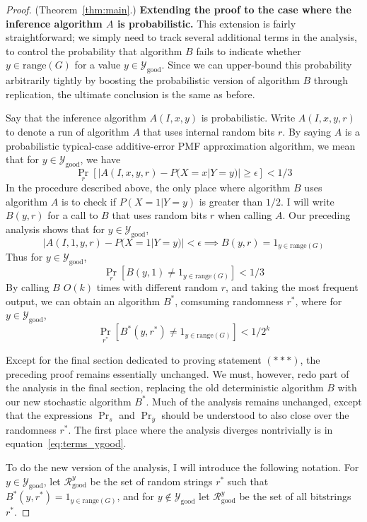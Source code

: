 \documentclass{article}
\def \Ygood{\mathcal{Y}_\text{good}}
\def \Rgood{\mathcal{R}_\text{good}}
\def \by{{\bar{y}}}
\theoremstyle{definition}
\theoremstyle{remark}
\begin{document}
\begin{proof}{(Theorem~\ref{thm:main}.)}
\medskip
\noindent
\textbf{Extending the proof to the case where the inference algorithm $A$ is probabilistic.}
This extension is fairly straightforward; we simply need to track several additional terms in the analysis, to control the probability that algorithm $B$ fails to indicate whether $y \in \text{range}(G)$ for a value $y \in \Ygood$.
Since we can upper-bound this probability arbitrarily tightly by boosting the probabilistic version of algorithm $B$ through replication, the ultimate conclusion is the same as before.

Say that the inference algorithm $A(I, x, y)$ is probabilistic.
Write $A(I, x, y, r)$ to denote a run of algorithm $A$ that uses internal random bits $r$.
By saying $A$ is a probabilistic typical-case additive-error PMF approximation algorithm, we mean that for $y \in \Ygood$, we have
$$
\Pr_r [|A(I, x, y, r) - P(X = x | Y = y)| \geq \epsilon] < 1/3
$$
In the procedure described above, the only place where algorithm $B$ uses algorithm $A$ is to check if $P(X = 1 | Y = y)$ is greater than $1/2$.
I will write $B(y, r)$ for a call to $B$ that uses random bits $r$ when calling $A$.
Our preceding analysis shows that for $y \in \Ygood$,
$$
|A(I, 1, y, r) - P(X = 1 | Y = y)| < \epsilon \implies  B(y, r) = 1_{y \in \text{range}(G)}
$$
Thus for $y \in \Ygood$,
$$
\Pr_r [B(y, 1) \neq 1_{y \in \text{range}(G)}] < 1/3
$$
By calling $B$ $O(k)$ times with different random $r$, and taking the most frequent output, we can obtain an algorithm $B^*$, comsuming randomness $r^*$, where for $y \in \Ygood$,
$$
\Pr_{r^*} [B^*(y, r^*) \neq 1_{y \in \text{range}(G)}] < 1/2^k
$$

Except for the final section dedicated to proving statement $(***)$, the preceding proof remains essentially unchanged.
We must, however, redo part of the analysis in the final section, replacing the old deterministic algorithm $B$ with our new stochastic algorithm $B^*$.
Much of the analysis remains unchanged, except that
the expressions $\Pr_s$ and $\Pr_\by$ should be understood to also close over the randomness $r^*$.
The first place where the analysis diverges nontrivially is in equation~\ref{eq:terms_ygood}.

To do the new version of the analysis, I will introduce the following notation. For $y \in \Ygood$, let $\Rgood^y$ be the set of random strings $r^*$ such that $B^*(y, r^*) = 1_{y \in \text{range}(G)}$,
and for $y \notin \Ygood$ let $\Rgood^y$ be the set of all bitstrings $r^*$.


\end{proof}
\end{document}
